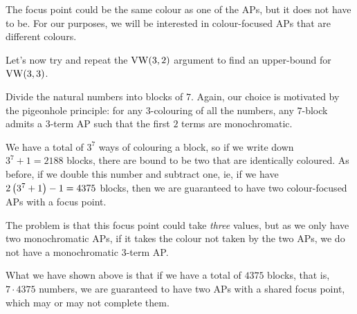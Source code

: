 The focus point could be the same colour as one of the APs, but it does not have to be. For our purposes, we will be interested in colour-focused APs that are different colours.

Let's now try and repeat the $\operatorname{VW}(3, 2)$ argument to find an upper-bound for $\operatorname{VW}(3, 3)$.

Divide the natural numbers into blocks of $7$. Again, our choice is motivated by the pigeonhole principle: for any $3$-colouring of all the numbers, any $7$-block admits a $3$-term AP such that the first $2$ terms are monochromatic.

\begin{figure}[H]
    \centering
\end{figure}

We have a total of $3^7$ ways of colouring a block, so if we write down $3^7 + 1 = 2188$ blocks, there are bound to be two that are identically coloured. As before, if we double this number and subtract one, ie, if we have $2\left( 3^7 + 1 \right) - 1 = 4375$ blocks, then we are guaranteed to have two colour-focused APs with a focus point.

The problem is that this focus point could take \textit{three} values, but as we only have two monochromatic APs, if it takes the colour not taken by the two APs, we do not have a monochromatic $3$-term AP.

What we have shown above is that if we have a total of $4375$ blocks, that is, $7 \cdot 4375$ numbers, we are guaranteed to have two APs with a shared focus point, which may or may not complete them.

